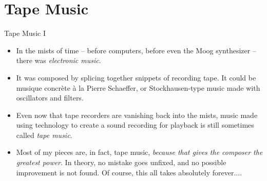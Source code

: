 \documentclass{beamer}
\begin{document}
\section{Tape Music}
\begin{frame}{Tape Music I}

\begin{itemize}
\item In the mists of time -- before computers, before even the Moog synthesizer -- there was \emph{electronic music}.
\item It was composed by splicing together snippets of recording tape. It could be musique concrète à la Pierre Schaeffer, or Stockhausen-type music made with oscillators and filters.
\item Even now that tape recorders are vanishing back into the mists, music made using technology to create a sound recording for playback is still sometimes called \emph{tape music}.
\item Most of my pieces are, in fact, tape music, \emph{because that gives the composer the greatest power}. In theory, no mistake goes unfixed, and no possible improvement is not found. Of course, this all takes absolutely forever....
\end{itemize}
\end{frame}
\end{document}
